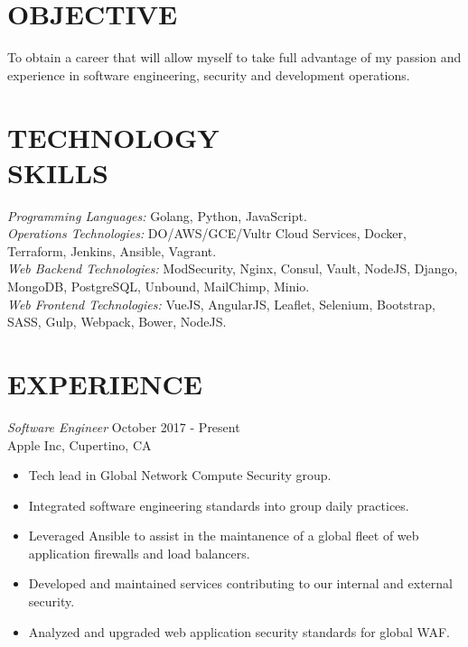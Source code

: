 \documentclass[margin, 10pt]{res} %
\begin{document}
\begin{resume}

 
\section{OBJECTIVE}  

To obtain a career that will allow myself to take full advantage of my passion and experience in software engineering, security and development operations. 


\section{TECHNOLOGY \\ SKILLS} 

{\sl Programming Languages:} Golang, Python, JavaScript. \\
{\sl Operations Technologies:} DO/AWS/GCE/Vultr Cloud Services, Docker, Terraform, Jenkins, Ansible, Vagrant. \\
{\sl Web Backend Technologies:} ModSecurity, Nginx, Consul, Vault, NodeJS, Django, MongoDB, PostgreSQL, Unbound, MailChimp, Minio. \\
{\sl Web Frontend Technologies:} VueJS, AngularJS, Leaflet, Selenium, Bootstrap, SASS, Gulp, Webpack, Bower, NodeJS. \\
 
 
\section{EXPERIENCE}

{\sl Software Engineer} \hfill October 2017 - Present \\
Apple Inc, Cupertino, CA
\begin{itemize}
\item Tech lead in Global Network Compute Security group.
\item Integrated software engineering standards into group daily practices.
\item Leveraged Ansible to assist in the maintanence of a global fleet of web application firewalls and load balancers.
\item Developed and maintained services contributing to our internal and external security.
\item Analyzed and upgraded web application security standards for global WAF.
\end{itemize} 


\end{resume}
\end{document}
